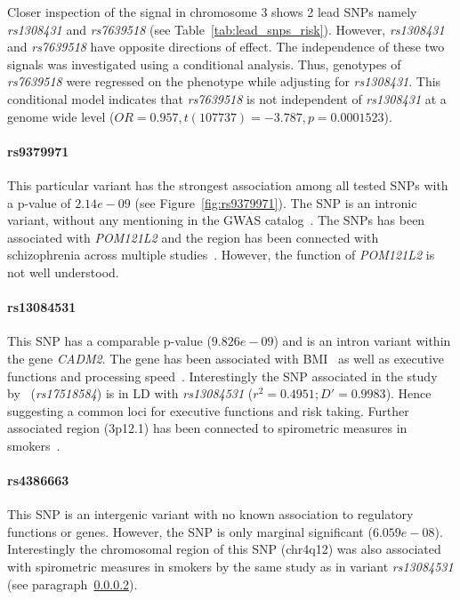 Closer inspection of the signal in chromosome 3 shows 2 lead SNPs namely \textit{rs1308431} and \textit{rs7639518} (see Table~\ref{tab:lead_snps_risk}).
However, \textit{rs1308431} and \textit{rs7639518} have opposite directions of effect.
The independence of these two signals was investigated using a conditional analysis.
Thus, genotypes of \textit{rs7639518} were regressed on the phenotype while adjusting for \textit{rs1308431}.
This conditional model indicates that \textit{rs7639518} is not independent of \textit{rs1308431} at a genome wide level ($OR=0.957, t(107737)=-3.787, p=0.0001523$).

\paragraph{rs9379971}
\label{par:rs9379971}
This particular variant has the strongest association among all tested SNPs with a p-value of $2.14e-09$ (see Figure~\ref{fig:rs9379971}). 
The SNP is an intronic variant, without any mentioning in the GWAS catalog~\cite{Welter2014}.
The SNPs has been associated with \textit{POM121L2} and the region has been connected with schizophrenia across multiple studies~\cite{Aberg2013,Shi2009}.
However, the function of \textit{POM121L2} is not well understood.

\paragraph{rs13084531}
\label{par:rs13084531}
This SNP has a comparable p-value ($9.826e-09$) and is an intron variant within the gene \textit{CADM2}.
The gene has been associated with BMI~\cite{Speliotes2010} as well as executive functions and processing speed~\cite{Ibrahim-Verbaas2015}.
Interestingly the SNP associated in the study by~\cite{Ibrahim-Verbaas2015} (\textit{rs17518584}) is in LD with \textit{rs13084531} ($r^2=0.4951;D'=0.9983$).
Hence suggesting a common loci for executive functions and risk taking.
Further associated region (3p12.1) has been connected to spirometric measures in smokers~\cite{Lutz2015}.

\paragraph{rs4386663}
\label{par:rs4386663}
This SNP is an intergenic variant with no known association to regulatory functions or genes.
However, the SNP is only marginal significant ($6.059e-08$).
Interestingly the chromosomal region of this SNP (chr4q12) was also associated with spirometric measures in smokers by the same study as in variant \textit{rs13084531} (see paragraph~\ref{par:rs13084531}).

